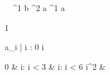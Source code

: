 \begin{eqcode}{\mu}{\ }{\ }{^1}
  b ^2 \lend
  a \in {}^1 \lend
  a \gets 
  \begin{tmatrix}
    1   \lend
  \end{tmatrix} \lend
  a_i | i : 0 \leq i  \gets
  \begin{cases}
    0 & i: i < 3  & i: i < 6 \lend
    i^2 & \otherwise \lend
  \end{cases}\lend
   \lend
\end{eqcode}
